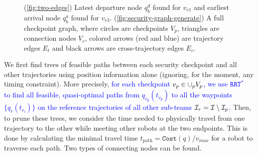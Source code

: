 \documentclass[10pt,twocolumn,twoside]{IEEEtran}
\newcommand{\rrtstar}{$\texttt{RRT}^\texttt{*}$}
\newcommand{\new}[1]{\textcolor{blue}{#1}}
\newcommand{\news}{\color{blue}}
\begin{document}
\begin{figure}[htbp]
    \centering
  \caption{{\news (\ref{fig:two-edges}) Latest departure node $q^{d}_{b}$ found for $v_{r1}$ and earliest arrival node $q^{a}_{b}$ found for $v_{r3}$. (\ref{fig:security-graph-generate}) A full checkpoint graph, where circles are checkpoints $V_p$, triangles are connection nodes $V_c$, colored arrows (red and blue) are trajectory edges $E_t$ and black arrows are cross-trajectory edges $E_c$.}}  
\end{figure}


We first find trees of feasible paths between each security checkpoint and all other trajectories using position information alone (ignoring, for the moment, any timing constraint). 
More precisely, \new{for each checkpoint $v_p \in \cup_p V_p$, we use \rrtstar~ to find all feasible, quasi-optimal paths from $q_{v_p}(t_{v_p})$ to all the waypoints $\{q_{r}(t_{{r}_{i}})\}$ on the reference trajectories of all other sub-teams $\mathcal{I}_{r} = \mathcal{I} \setminus \mathcal{I}_{p}$.}
Then, to prune these trees, we consider the time needed to physically travel from one trajectory to the other while meeting other robots at the two endpoints. This is done by calculating the minimal travel time $t_{\textrm{path}}=\texttt{Cost}(q)/v_{max}$ for a robot to traverse each path. Two types of connecting nodes can be found.
\end{document}
